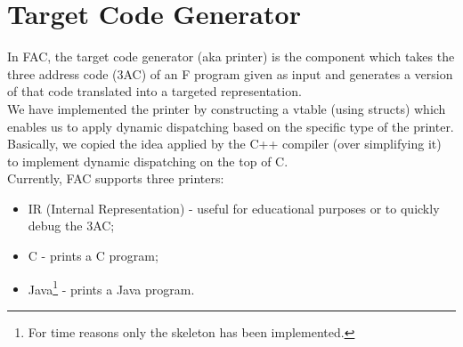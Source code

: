 \section{Target Code Generator}

In FAC, the target code generator (aka printer) is the component which takes the
three address code (3AC) of an F program given as input and generates a version
of that code translated into a targeted representation.
\\
We have implemented the printer by constructing a vtable
(using structs) which enables us to apply dynamic dispatching based on the
specific type of the printer. Basically, we copied the idea applied by the C++
compiler (over simplifying it) to implement dynamic dispatching on the top of C.
\\
Currently, FAC supports three printers:
\begin{itemize}
\item IR (Internal Representation) - useful for educational purposes or to
quickly debug the 3AC;
\item C - prints a C program;
\item Java\footnote{For time reasons only the skeleton has been implemented.}
- prints a Java program.
\end{itemize}